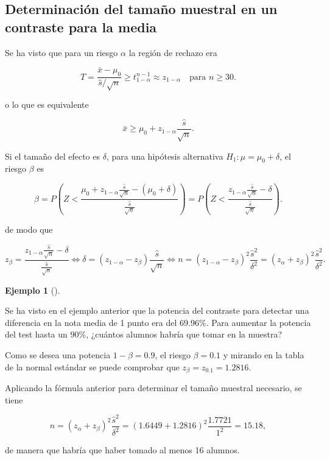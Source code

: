 \documentclass[
  a4paper,
]{scrreport}
\theoremstyle{plain}
\theoremstyle{definition}
\theoremstyle{definition}
\newtheorem{example}{Ejemplo}[chapter]
\theoremstyle{remark}
\begin{document}
\subsection{Determinación del tamaño muestral en un contraste para la
media}\label{determinaciuxf3n-del-tamauxf1o-muestral-en-un-contraste-para-la-media}

Se ha visto que para un riesgo \(\alpha\) la región de rechazo era

\[
T=\frac{\bar x-\mu_0}{\hat s/\sqrt{n}} \geq t^{n-1}_{1-\alpha} \approx z_{1-\alpha}\quad \mbox{para } n\geq 30.
\]

o lo que es equivalente

\[
\bar x \geq \mu_0+z_{1-\alpha}\frac{\hat s}{\sqrt n}.
\]

Si el tamaño del efecto es \(\delta\), para una hipótesis alternativa
\(H_1:\mu=\mu_0+\delta\), el riesgo \(\beta\) es

\[
\beta = P\left(Z< \frac{\mu_0+z_{1-\alpha}\frac{\hat s}{\sqrt n}-(\mu_0+\delta)}{\frac{\hat s}{\sqrt n}} \right) = P\left(Z< \frac{z_{1-\alpha}\frac{\hat s}{\sqrt n}-\delta}{\frac{\hat s}{\sqrt n}} \right).
\]

de modo que

\[
z_\beta = \frac{z_{1-\alpha}\frac{\hat s}{\sqrt n}-\delta}{\frac{\hat s}{\sqrt n}} \Leftrightarrow \delta = (z_{1-\alpha}-z_\beta)\frac{\hat s}{\sqrt n} \Leftrightarrow n = (z_{1-\alpha}-z_\beta)^2\frac{\hat s^2}{\delta^2} = (z_\alpha+z_\beta)^2\frac{\hat s^2}{\delta^2}.
\]

\begin{example}[]\protect\hypertarget{exm-tamaño-muestral-contraste-media}{}\label{exm-tamaño-muestral-contraste-media}

Se ha visto en el ejemplo anterior que la potencia del contraste para
detectar una diferencia en la nota media de 1 punto era del \(69.96%
\)\%. Para aumentar la potencia del test hasta un \(90\)\%, ¿cuántos
alumnos habría que tomar en la muestra?

Como se desea una potencia \(1-\beta=0.9\), el riesgo \(\beta=0.1\) y
mirando en la tabla de la normal estándar se puede comprobar que
\(z_\beta = z_{0.1}=1.2816\).

Aplicando la fórmula anterior para determinar el tamaño muestral
necesario, se tiene

\[
n = (z_\alpha+z_\beta)^2\frac{\hat s^2}{\delta^2} = (1.6449+1.2816)^2\frac{1.7721}{1^2} = 15.18,
\]

de manera que habría que haber tomado al menos 16 alumnos.

\end{example}
\end{document}
